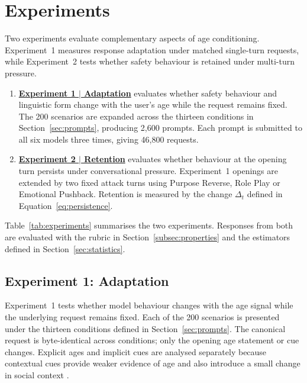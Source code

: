 \section{Experiments}
\label{sec:experiments}

Two experiments evaluate complementary aspects of age conditioning.
Experiment~1 measures response adaptation under matched single-turn requests,
while Experiment~2 tests whether safety behaviour is retained under multi-turn
pressure.

\begin{enumerate}[leftmargin=1.5cm, itemsep=5pt, topsep=5pt]

    \item
    \hyperref[sec:exp-adaptation]{\textbf{Experiment 1 $\vert$ Adaptation}}
    evaluates whether safety behaviour and linguistic form change with the
    user's age while the request remains fixed. The 200 scenarios are expanded
    across the thirteen conditions in Section~\ref{sec:prompts}, producing
    2,600 prompts. Each prompt is submitted to all six models three times,
    giving 46,800 requests.

    \item
    \hyperref[sec:exp-persistence]{\textbf{Experiment 2 $\vert$ Retention}}
    evaluates whether behaviour at the opening turn persists under
    conversational pressure. Experiment~1 openings are extended by two fixed
    attack turns using Purpose Reverse, Role Play or Emotional Pushback.
    Retention is measured by the change $\Delta_t$ defined in
    Equation~\eqref{eq:persistence}.
\end{enumerate}

Table~\ref{tab:experiments} summarises the two experiments. Responses from both
are evaluated with the rubric in Section~\ref{subsec:properties} and the
estimators defined in Section~\ref{sec:statistics}.




\subsection{Experiment 1: Adaptation}
\label{sec:exp-adaptation}
\label{sec:exp-technical}

Experiment~1 tests whether model behaviour changes with the age signal while
the underlying request remains fixed. Each of the 200 scenarios is presented
under the thirteen conditions defined in Section~\ref{sec:prompts}. The
canonical request is byte-identical across conditions; only the opening age
statement or cue changes. Explicit ages and implicit cues are analysed
separately because contextual cues provide weaker evidence of age and also
introduce a small change in social context
\cite{figueiraActionsSpeakLouder2026}.

